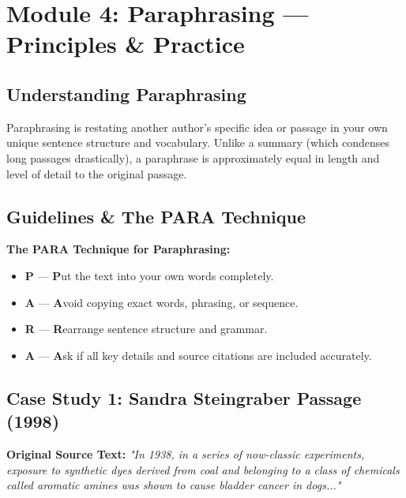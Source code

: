 \documentclass[11pt, a4paper]{article}
\begin{document}
\newpage

\section{Module 4: Paraphrasing --- Principles \& Practice}

\subsection{Understanding Paraphrasing}
Paraphrasing is restating another author's specific idea or passage in your own unique sentence structure and vocabulary. 
Unlike a summary (which condenses long passages drastically), a paraphrase is approximately equal in length and level of detail to the original passage.

\subsection{Guidelines \& The PARA Technique}
\begin{mdframed}[style=summarybox]
    \textbf{The PARA Technique for Paraphrasing:}
    \begin{itemize}
        \item \textbf{P} --- \textbf{P}ut the text into your own words completely.
        \item \textbf{A} --- \textbf{A}void copying exact words, phrasing, or sequence.
        \item \textbf{R} --- \textbf{R}earrange sentence structure and grammar.
        \item \textbf{A} --- \textbf{A}sk if all key details and source citations are included accurately.
    \end{itemize}
\end{mdframed}

\subsection{Case Study 1: Sandra Steingraber Passage (1998)}
\textbf{Original Source Text:}
\textit{"In 1938, in a series of now-classic experiments, exposure to synthetic dyes derived from coal and belonging to a class of chemicals called aromatic amines was shown to cause bladder cancer in dogs..."}
\end{document}
